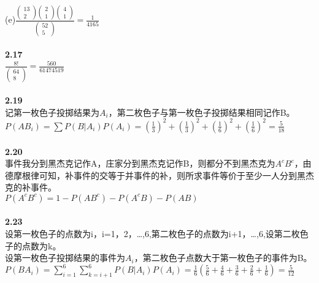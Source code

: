 \documentclass{book}%
\begin{document}
	(e)$\frac{\begin{pmatrix}
			13\\2
		\end{pmatrix}\begin{pmatrix}
			2\\1
		\end{pmatrix}\begin{pmatrix}
			4\\1
	\end{pmatrix}}{\begin{pmatrix}
			52\\5
	\end{pmatrix}}=\frac{1}{4165}$\\
	~\\
	
	{\bfseries 2.17}\\
	$\frac{8!}{\begin{pmatrix}
			64\\8
	\end{pmatrix}}=\frac{560}{61474519}$\\
	~\\
	
	{\bfseries 2.19}\\
	记第一枚色子投掷结果为$A_{i}$，第二枚色子与第一枚色子投掷结果相同记作B。\\
	$P(AB_{i})=\sum P(B|A_{i})P(A_{i})=({\frac{1}{3}})^{2}+({\frac{1}{3}})^{2}+({\frac{1}{6}})^{2}+({\frac{1}{6}})^{2}=\frac{5}{18}$\\
	~\\
	
	{\bfseries 2.20}\\
	事件我分到黑杰克记作A，庄家分到黑杰克记作B，则都分不到黑杰克为$A^{c}B^{c}$，由德摩根律可知，补事件的交等于并事件的补，则所求事件等价于至少一人分到黑杰克的补事件。\\
	$P(A^{c}B^{c})=1-P(AB^{c})-P(A^{c}B)-P(AB)$\\
	~\\
	
	{\bfseries 2.23}\\
	设第一枚色子的点数为i，i=1，2，\dots ,6,第二枚色子的点数为i+1，\dots ,6,设第二枚色子的点数为k。\\
	设第一枚色子投掷结果的事件为$A_{i}$，第二枚色子点数大于第一枚色子的事件为B。\\
	$P(BA_{i})=\sum\limits_{i=1}^{6}\sum\limits_{k=i+1}^{6}P(B|A_{i})P(A_{i})=
	\frac{1}{6}(\frac{5}{6}+\frac{4}{6}+\frac{3}{6}+\frac{2}{6}+\frac{1}{6})=\frac{5}{12}$\\
	~\\
	
\end{document}
